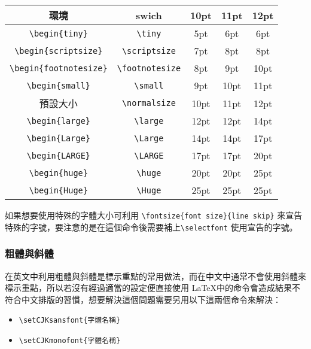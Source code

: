\begin{tabular}{ccccc}
\hline
環境 & swich & 10pt & 11pt & 12pt \\\hline\hline
\verb|\begin{tiny}| & \verb|\tiny|  & 5pt & 6pt & 6pt \\\hline
\verb|\begin{scriptsize}| & \verb|\scriptsize| & 7pt & 8pt & 8pt \\\hline
\verb|\begin{footnotesize}| & \verb|\footnotesize| & 8pt & 9pt & 10pt \\\hline
\verb|\begin{small}| & \verb|\small| & 9pt & 10pt & 11pt \\\hline
預設大小 & \verb|\normalsize| & 10pt & 11pt & 12pt \\\hline
\verb|\begin{large}| & \verb|\large| & 12pt & 12pt & 14pt \\\hline
\verb|\begin{Large}| & \verb|\Large| & 14pt & 14pt & 17pt \\\hline
\verb|\begin{LARGE}| & \verb|\LARGE| & 17pt & 17pt & 20pt \\\hline
\verb|\begin{huge}| & \verb|\huge| & 20pt & 20pt & 25pt \\\hline
\verb|\begin{Huge}| & \verb|\Huge| & 25pt & 25pt & 25pt \\\hline
\end{tabular}

如果想要使用特殊的字體大小可利用 \verb|\fontsize{font size}{line skip}| 來宣告特殊的字號，要注意的是在這個命令後需要補上\verb|\selectfont| 使用宣告的字號。


\subsubsection{粗體與斜體}

在英文中利用粗體與斜體是標示重點的常用做法，而在中文中通常不會使用斜體來標示重點，所以若沒有經過適當的設定便直接使用 \LaTeX 中的命令會造成結果不符合中文排版的習慣，想要解決這個問題需要另用以下這兩個命令來解決：

\begin{itemize}
\item \verb|\setCJKsansfont{字體名稱}|
\item \verb|\setCJKmonofont{字體名稱}|
\end{itemize}

